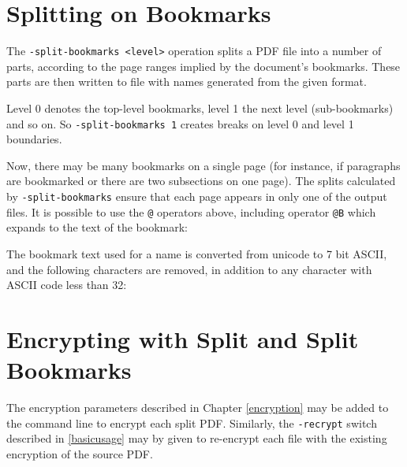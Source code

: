 \documentclass{book}
\begin{document}
  \section{Splitting on Bookmarks}
  The \texttt{-split-bookmarks <level>} operation splits a PDF file into a number of
parts, according to the page ranges implied by the document's bookmarks. These
parts are then written to file with names generated from the given format.
  
Level 0 denotes the top-level bookmarks, level 1 the next level (sub-bookmarks)
and so on. So \texttt{-split-bookmarks 1} creates breaks on level 0 and level
1 boundaries.

\noindent{}

\noindent Now, there may be many bookmarks on a single page (for instance, if
paragraphs are bookmarked or there are two subsections on one page). The splits
calculated by \texttt{-split-bookmarks} ensure that each page appears in only
one of the output files.
  It is possible to use the \texttt{@} operators above, including operator \texttt{@B} which expands to the text of the bookmark:

\noindent{}



\noindent The bookmark text used for a name is converted from unicode to 7 bit ASCII, and the following characters are removed, in addition to any character with ASCII code less than 32:

\noindent{}


\section{Encrypting with Split and Split Bookmarks}

The encryption parameters described in Chapter \ref{encryption} may be added to the command line to encrypt each split PDF. Similarly, the \texttt{-recrypt} switch described in \ref{basicusage} may by given to re-encrypt each file with the existing encryption of the source PDF. 
\pagestyle{empty}\thispagestyle{fancy}
\end{document}
